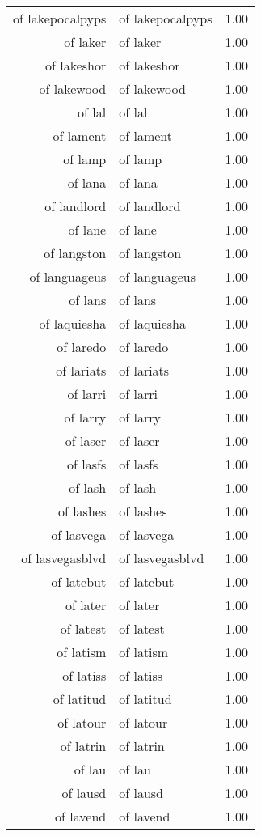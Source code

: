 \begin{table}[ht]
\begin{tabular}{rlr}
  of lakepocalpyps & of lakepocalpyps & 1.00 \\ 
  of laker & of laker & 1.00 \\ 
  of lakeshor & of lakeshor & 1.00 \\ 
  of lakewood & of lakewood & 1.00 \\ 
  of lal & of lal & 1.00 \\ 
  of lament & of lament & 1.00 \\ 
  of lamp & of lamp & 1.00 \\ 
  of lana & of lana & 1.00 \\ 
  of landlord & of landlord & 1.00 \\ 
  of lane & of lane & 1.00 \\ 
  of langston & of langston & 1.00 \\ 
  of languageus & of languageus & 1.00 \\ 
  of lans & of lans & 1.00 \\ 
  of laquiesha & of laquiesha & 1.00 \\ 
  of laredo & of laredo & 1.00 \\ 
  of lariats & of lariats & 1.00 \\ 
  of larri & of larri & 1.00 \\ 
  of larry & of larry & 1.00 \\ 
  of laser & of laser & 1.00 \\ 
  of lasfs & of lasfs & 1.00 \\ 
  of lash & of lash & 1.00 \\ 
  of lashes & of lashes & 1.00 \\ 
  of lasvega & of lasvega & 1.00 \\ 
  of lasvegasblvd & of lasvegasblvd & 1.00 \\ 
  of latebut & of latebut & 1.00 \\ 
  of later & of later & 1.00 \\ 
  of latest & of latest & 1.00 \\ 
  of latism & of latism & 1.00 \\ 
  of latiss & of latiss & 1.00 \\ 
  of latitud & of latitud & 1.00 \\ 
  of latour & of latour & 1.00 \\ 
  of latrin & of latrin & 1.00 \\ 
  of lau & of lau & 1.00 \\ 
  of lausd & of lausd & 1.00 \\ 
  of lavend & of lavend & 1.00 \\ 

\end{tabular}
\end{table}
